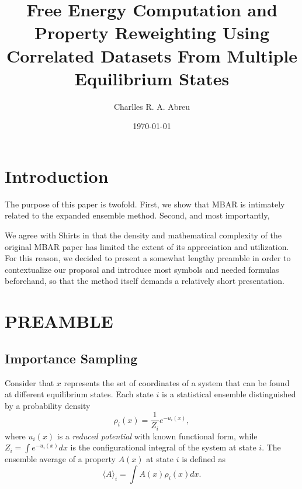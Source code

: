 \documentclass[aip,jcp,reprint,amsmath,amssymb]{revtex4-1}
\begin{document}
\title{Free Energy Computation and Property Reweighting Using Correlated Datasets From Multiple Equilibrium States}

\author{Charlles R. A. Abreu}

\date{\today}

\maketitle

\section{Introduction}
\label{sec:introduction}

The purpose of this paper is twofold. First, we show that MBAR is intimately related to the expanded ensemble method. Second, and most importantly, 

We agree with Shirts\cite{Shirts_2017} in that the density and mathematical complexity of the original MBAR paper has limited the extent of its appreciation and utilization. For this reason, we decided to present a somewhat lengthy preamble in order to contextualize our proposal and introduce most symbols and needed formulas beforehand, so that the method itself demands a relatively short presentation.

\section{PREAMBLE}

\subsection{Importance Sampling}
\label{sec:definitions}

Consider that $x$ represents the set of coordinates of a system that can be found at different equilibrium states. Each state $i$ is a statistical ensemble distinguished by a probability density
\begin{equation}
\label{eq:state_prob_density}
\rho_i(x) = \frac{1}{Z_i} e^{-u_i(x)},
\end{equation}
where $u_i(x)$ is a \textit{reduced potential}\cite{Shirts_2008, Chodera_2011} with known functional form, while $Z_i = \int e^{-u_i(x)}dx$ is the configurational integral of the system at state $i$. The ensemble average of a property $A(x)$ at state $i$ is defined as
\begin{equation}
\label{eq:ensemble average}
\langle A \rangle_i = \int A(x)\rho_i(x)dx.
\end{equation}
\end{document}
